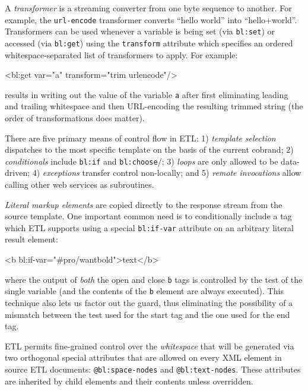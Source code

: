 \documentclass{www2003-submission}
\newcommand{\B}{\discretionary{}{}{}}
\newcommand{\smtexttt}[1]{{\small\texttt{#1}}}
\newcommand{\etl}{ETL}
\newenvironment{smallverbatim}%
{\renewcommand{\baselinestretch}{1}\small\verbatim}%
{\renewcommand{\baselinestretch}{2}\endverbatim}
\begin{document}
A \emph{transformer} is a streaming converter from one byte sequence
to another.  For example, the \smtexttt{url-encode} transformer
converts ``hello world'' into ``hello+world''.  Transformers can be
used whenever a variable is being set (via
\smtexttt{bl:set}) or accessed (via \smtexttt{bl:get}) using the
\smtexttt{transform} attribute which specifies an ordered whitespace-separated
list of transformers to apply.  For example:

\begin{smallverbatim}
<bl:get var="a" transform="trim urlencode"/>
\end{smallverbatim}

\noindent results in writing out the value of the variable \smtexttt{a}
after first eliminating leading and trailing whitespace and then
URL-encoding the resulting trimmed string (the order of
transformations does matter).

There are five primary means of control flow in \etl{}: 1)
\emph{template selection} dispatches to the most specific template on
the basis of the current cobrand; 2) \emph{conditionals} include
\smtexttt{bl:if} and \smtexttt{bl:choose}/\B{}\smtexttt{bl:when}; 3)
\emph{loops} are only allowed to be data-driven; 4) \emph{exceptions} 
transfer control non-locally; and 5) \emph{remote invocations} allow
calling other web services as subroutines.

\emph{Literal markup elements} are copied directly to the response
stream from the source template.  One important common need is to
conditionally include a tag which \etl{} supports using a special
\smtexttt{bl:if-var} attribute on an arbitrary literal result element:

\begin{smallverbatim}
<b bl:if-var="#pro/wantbold">text</b>
\end{smallverbatim}

\noindent where the output of \emph{both} the open and close
\smtexttt{b} tags is controlled by the test of the single variable
(and the contents of the \smtexttt{b} element are always
executed). This technique also lets us factor out the guard, thus
eliminating the possibility of a mismatch between the test used for
the start tag and the one used for the end tag.

\etl{} permits fine-grained control over the \emph{whitespace} that will be
generated via two orthogonal special attributes that are allowed on
every XML element in source \etl{} documents:
\smtexttt{@bl:space-nodes} and \smtexttt{@bl:text-nodes}.  These
attributes are inherited by child elements and their contents unless
overridden.
\end{document}
